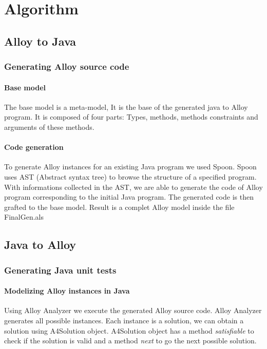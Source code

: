\section{Algorithm}
\label{sec:Algorithm}
\subsection{Alloy to Java}
\subsubsection{Generating Alloy source code}
\paragraph{Base model}
The base model is a meta-model, It is the base of the generated java to Alloy program.
It is composed of four parts: Types, methods, methods constraints and arguments of these methods.


\paragraph{Code generation}
To generate Alloy instances for an existing Java program we used Spoon. Spoon uses AST (Abstract syntax tree)\cite{ast} to browse the structure of a specified program. With informations collected in the AST, we are able to generate the code of Alloy program corresponding to the initial Java program. The generated code is then grafted to the base model.
Result is a complet Alloy model inside the file FinalGen.als

\subsection{Java to Alloy}
\subsubsection{Generating Java unit tests}
\paragraph{Modelizing Alloy instances in Java}
Using Alloy Analyzer we execute the generated Alloy source code. Alloy Analyzer generates all possible instances.
Each instance is a solution, we can obtain a solution using A4Solution object. A4Solution object has a method \textit{satisfiable} to check if the solution is valid and a method \textit{next} to go the next possible solution.

